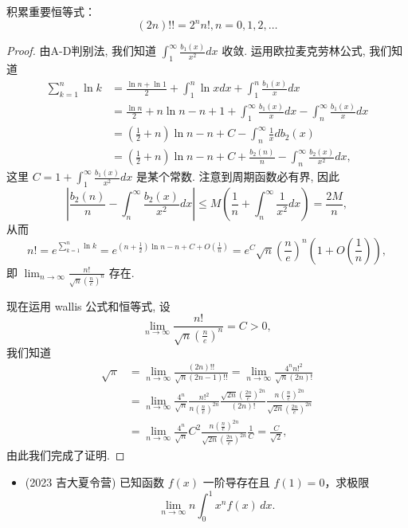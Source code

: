 \documentclass[lang=cn,10pt,thmcnt=section]{elegantbook}
\begin{document}
\begin{remark}
	积累重要恒等式：
	$$ (2n)!! = 2^n n!, n=0, 1, 2, \dots  $$
\end{remark}
\begin{proof}
	由A-D判别法, 我们知道 $\int_1^\infty \frac{b_1(x)}{x^2}dx$ 收敛. 运用欧拉麦克劳林公式, 我们知道
\begin{align*}
\sum_{k=1}^n \ln k &= \frac{\ln n + \ln 1}{2} + \int_1^n \ln x dx + \int_1^n \frac{b_1(x)}{x} dx \\
&= \frac{\ln n}{2} + n \ln n - n + 1 + \int_1^\infty \frac{b_1(x)}{x}dx - \int_n^\infty \frac{b_1(x)}{x}dx \\
&= \left(\frac{1}{2}+n\right)\ln n - n + C - \int_n^\infty \frac{1}{x}db_2(x) \\
&= \left(\frac{1}{2}+n\right)\ln n - n + C + \frac{b_2(n)}{n} - \int_n^\infty \frac{b_2(x)}{x^2} dx,
\end{align*}
这里 $C = 1+\int_1^\infty \frac{b_1(x)}{x^2}dx$ 是某个常数.
注意到周期函数必有界, 因此
$$ \left| \frac{b_2(n)}{n} - \int_n^\infty \frac{b_2(x)}{x^2}dx \right| \le M\left(\frac{1}{n} + \int_n^\infty \frac{1}{x^2}dx \right) = \frac{2M}{n}, $$
从而
$$ n! = e^{\sum_{k=1}^n \ln k} = e^{(n+\frac{1}{2})\ln n - n + C + O(\frac{1}{n})} = e^C \sqrt{n} \left(\frac{n}{e}\right)^n \left(1+O\left(\frac{1}{n}\right)\right), $$
即 $\lim_{n \to \infty} \frac{n!}{\sqrt{n}(\frac{n}{e})^n}$ 存在.


现在运用 wallis 公式和恒等式, 设
$$ \lim_{n \to \infty} \frac{n!}{\sqrt{n}\left(\frac{n}{e}\right)^n} = C > 0, $$
我们知道
\begin{align*}
\sqrt{\pi} &= \lim_{n \to \infty} \frac{(2n)!!}{\sqrt{n}(2n-1)!!} = \lim_{n \to \infty} \frac{4^n n!^2}{\sqrt{n}(2n)!} \\
&= \lim_{n \to \infty} \frac{4^n}{\sqrt{n}} \frac{n!^2}{n\left(\frac{n}{e}\right)^{2n}} \frac{\sqrt{2n}\left(\frac{2n}{e}\right)^{2n}}{(2n)!} \frac{n\left(\frac{n}{e}\right)^{2n}}{\sqrt{2n}\left(\frac{2n}{e}\right)^{2n}} \\
&= \lim_{n \to \infty} \frac{4^n}{\sqrt{n}} C^2 \frac{n\left(\frac{n}{e}\right)^{2n}}{\sqrt{2n}\left(\frac{2n}{e}\right)^{2n}} \frac{1}{C} = \frac{C}{\sqrt{2}},
\end{align*}
由此我们完成了证明.
\end{proof}
\begin{example}
	\begin{itemize}
		\item (2023 吉大夏令营) 已知函数 $f(x)$ 一阶导存在且 $f(1) = 0$，求极限
		\[
		\lim_{n \to \infty} n \int_{0}^{1} x^{n} f(x) \, dx.
		\]
	\end{itemize}
\end{example}
\end{document}
